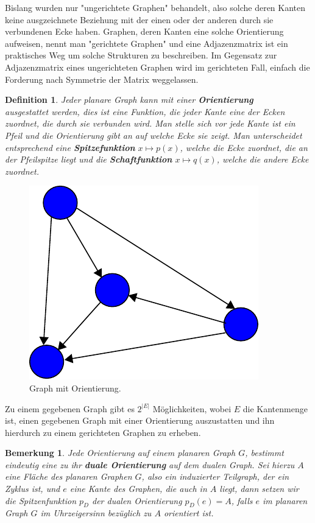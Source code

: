 \documentclass[11pt,a4paper,leqno]{report}
\newtheorem{definition}[theorem]{Definition}
\newtheorem{remark}[theorem]{Bemerkung}
\numberwithin{equation}{chapter}
\begin{document}
\noindent
Bislang wurden nur "ungerichtete Graphen" behandelt, also solche deren Kanten keine ausgzeichnete Beziehung mit der einen oder der anderen durch sie verbundenen Ecke haben. Graphen, deren Kanten eine solche Orientierung aufweisen, nennt man "gerichtete Graphen" und eine Adjazenzmatrix ist ein praktisches Weg um solche Strukturen zu beschreiben. Im Gegensatz zur Adjazenzmatrix eines ungerichteten Graphen wird im gerichteten Fall, einfach die Forderung nach Symmetrie der Matrix weggelassen.
\begin{definition}
	Jeder planare Graph kann mit einer \textbf{Orientierung} \\ausgestattet werden, dies ist eine Funktion, die jeder Kante eine der Ecken zuordnet, die durch sie verbunden wird. Man stelle sich vor jede Kante ist ein Pfeil und die Orientierung gibt an auf welche Ecke sie zeigt. Man unterscheidet entsprechend eine \textbf{Spitzefunktion} $x\mapsto p(x)$, welche die Ecke zuordnet, die an der Pfeilspitze liegt und die \textbf{Schaftfunktion} $x\mapsto q(x)$, welche die andere Ecke zuordnet.
\end{definition}
\begin{figure}[H]
	\begin{center}
		\includegraphics[scale=0.4]{Abbildungen/graph_1_orient.pdf}
		\caption{Graph mit Orientierung.}
	\end{center}
\end{figure}
\noindent
 Zu einem gegebenen Graph gibt es $2^{|E|}$ M\"oglichkeiten, wobei $E$ die Kanten\-menge ist, einen gegebenen Graph mit einer Orientierung auszustatten und ihn hierdurch zu einem gerichteten Graphen zu erheben.
 \begin{remark}
 	Jede Orientierung auf einem planaren Graph $G$, bestimmt eindeutig eine zu ihr \textbf{duale Orientierung} auf dem dualen Graph. Sei hierzu $A$ eine Fl\"ache des planaren Graphen $G$, also ein induzierter Teilgraph, der ein Zyklus ist, und $e$ eine Kante des Graphen, die auch in $A$ liegt, dann setzen wir die Spitzenfunktion $p_D$ der dualen Orientierung $p_D(e) = A$, falls $e$ im planaren Graph $G$ im Uhrzeigersinn bez\"uglich zu $A$ orientiert ist.
 \end{remark}
\end{document}

